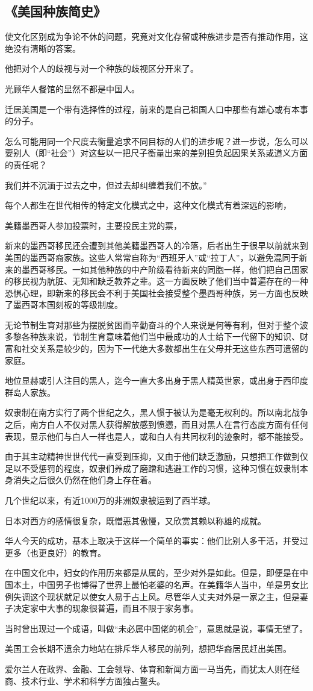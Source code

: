 \subsection{《美国种族简史》}
使文化区别成为争论不休的问题，究竟对文化存留或种族进步是否有推动作用，这绝没有清晰的答案。

他把对个人的歧视与对一个种族的歧视区分开来了。

光顾华人餐馆的显然不都是中国人。

迁居美国是一个带有选择性的过程，前来的是自己祖国人口中那些有雄心或有本事的分子。

怎么可能用同一个尺度去衡量追求不同目标的人们的进步呢？进一步说，怎么可以要别人（即“社会”）对这些以一把尺子衡量出来的差别担负起因果关系或道义方面的责任呢？

我们并不沉湎于过去之中，但过去却纠缠着我们不放。”

每个人都生在世代相传的特定文化模式之中，这种文化模式有着深远的影响，

美籍墨西哥人参加投票时，主要投民主党的票，

新来的墨西哥移民还会遭到其他美籍墨西哥人的冷落，后者出生于很早以前就来到美国的墨西哥裔家族。这些人常常自称为“西班牙人”或“拉丁人”，以避免混同于新来的墨西哥移民。一如其他种族的中产阶级看待新来的同胞一样，他们把自己国家的移民视为肮脏、无知和缺乏教养之辈。这一方面反映了他们当中普遍存在的一种恐惧心理，即新来的移民会不利于美国社会接受整个墨西哥种族，另一方面也反映了墨西哥本国刻板的等级制度。

无论节制生育对那些为摆脱贫困而辛勤奋斗的个人来说是何等有利，但对于整个波多黎各种族来说，节制生育意味着他们当中最成功的人士给下一代留下的知识、财富和社交关系是较少的，因为下一代绝大多数都出生在父母并无这些东西可遗留的家庭。

地位显赫或引人注目的黑人，迄今一直大多出身于黑人精英世家，或出身于西印度群岛人家族。

奴隶制在南方实行了两个世纪之久，黑人惯于被认为是毫无权利的。所以南北战争之后，南方白人不仅对黑人获得解放感到愤懑，而且对黑人在言行态度方面有任何表现，显示他们与白人一样也是人，或和白人有共同权利的迹象时，都不能接受。

由于其主动精神世世代代一直受到压抑，又由于他们缺乏激励，只想把工作做到仅足以不受惩罚的程度，奴隶们养成了磨蹭和逃避工作的习惯，这种习惯在奴隶制本身消失之后很久仍然在他们身上存在着。

几个世纪以来，有近1000万的非洲奴隶被运到了西半球。

日本对西方的感情很复杂，既憎恶其傲慢，又欣赏其赖以称雄的成就。

华人今天的成功，基本上取决于这样一个简单的事实：他们比别人多干活，并受过更多（也更良好）的教育。

在中国文化中，妇女的作用历来都是从属的，至少对外是如此。但是，即便是在中国本土，中国男子也博得了世界上最怕老婆的名声。在美籍华人当中，单是男女比例失调这个现状就足以使女人易于占上风。尽管华人丈夫对外是一家之主，但是妻子决定家中大事的现象很普遍，而且不限于家务事。

当时曾出现过一个成语，叫做“未必属中国佬的机会”，意思就是说，事情无望了。

美国工会长期不遗余力地站在排斥华人移民的前列，想把华裔居民赶出美国。

爱尔兰人在政界、金融、工会领导、体育和新闻方面一马当先，而犹太人则在经商、技术行业、学术和科学方面独占鳌头。